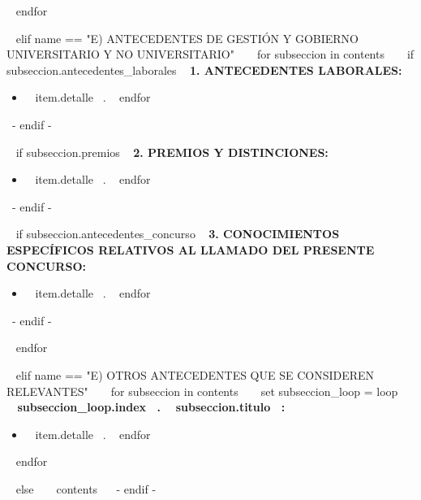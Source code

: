   ~{ endfor }~
  \espacioEntreSecciones{}


~{ elif name == "E) ANTECEDENTES DE GESTIÓN Y GOBIERNO UNIVERSITARIO Y NO UNIVERSITARIO" }~
  ~{ for subseccion in contents }~
    ~{ if subseccion.antecedentes_laborales }~
      \textbf{1. ANTECEDENTES LABORALES:}
      \begin{itemize}
      ~{ for item in subseccion.antecedentes_laborales }~
        \item ~{{ item.detalle }}~.
        \espacioEntreItems{}
      ~{ endfor }~
      \end{itemize}
      \espacioEntreSubSecciones{}
    ~{- endif -}~

    ~{ if subseccion.premios }~
      \textbf{2. PREMIOS Y DISTINCIONES:}
      \begin{itemize}
      ~{ for item in subseccion.premios }~
        \item ~{{ item.detalle }}~.
        \espacioEntreItems{}
      ~{ endfor }~
      \end{itemize}
      \espacioEntreSubSecciones{}
    ~{- endif -}~

    ~{ if subseccion.antecedentes_concurso }~
      \textbf{3. CONOCIMIENTOS ESPECÍFICOS RELATIVOS AL LLAMADO DEL PRESENTE CONCURSO:}
      \begin{itemize}
      ~{ for item in subseccion.antecedentes_concurso }~
        \item ~{{ item.detalle }}~.
        \espacioEntreItems{}
      ~{ endfor }~
      \end{itemize}
      \espacioEntreSubSecciones{}
    ~{- endif -}~

  ~{ endfor }~
  \espacioEntreSecciones{}


~{ elif name == "E) OTROS ANTECEDENTES QUE SE CONSIDEREN RELEVANTES" }~
  ~{ for subseccion in contents }~
    ~{ set subseccion_loop = loop }~
    \textbf{~{{ subseccion_loop.index }}~. ~{{ subseccion.titulo }}~:}
    \begin{itemize}
    ~{ for item in subseccion.antecedentes }~
      \item ~{{ item.detalle }}~.
      \espacioEntreItems{}
    ~{ endfor }~
    \end{itemize}
    \espacioEntreSubSecciones{}

  ~{ endfor }~
  \espacioEntreSecciones{}


~{ else }~
  ~{{ contents }}~
  \bigskip
~{- endif -}~

